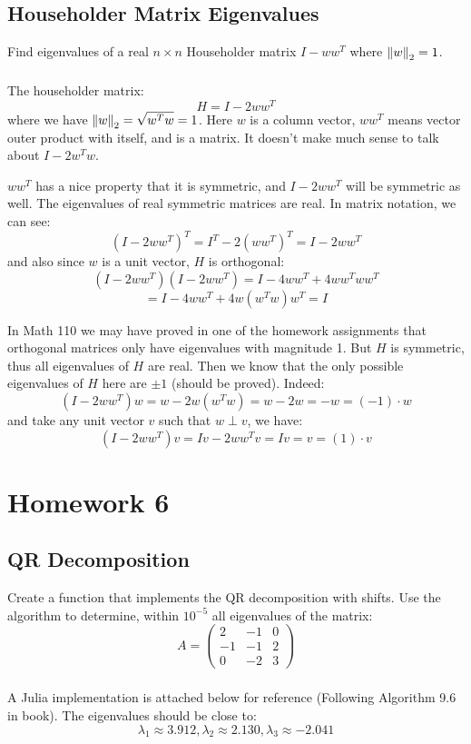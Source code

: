 \documentclass[12pt]{article} %
\newcommand{\1}[1]{\mathds{1}\left[#1\right]}
\begin{document}
\subsection{Householder Matrix Eigenvalues}
Find eigenvalues of a real $n\times n$ Householder matrix $I - ww^T$ where $\norm{w}_2 = 1$.
\subsubsection{}
The householder matrix:
$$
	H = I - 2ww^{T}
$$ where we have $\norm{w}_2 =\sqrt{w^Tw} =1$. Here $w$ is a column vector, $ww^T$ means vector outer product with itself, and is a matrix. It doesn't make much sense to talk about $I - 2w^Tw$.

$ww^T$ has a nice property that it is symmetric, and $I-2ww^T$ will be symmetric as well. The eigenvalues of real symmetric matrices are real. In matrix notation, we can see:
$$
	(I-2ww^T)^T = I^T - 2(ww^T)^T = I - 2ww^T
$$ and also since $w$ is a unit vector, $H$ is orthogonal:
$$
	(I-2ww^T)(I-2ww^T) = I-4ww^T+4ww^Tww^T
$$
$$
	= I-4ww^T+4w(w^Tw)w^T = I
$$

In Math 110 we may have proved in one of the homework assignments that orthogonal matrices only have eigenvalues with magnitude 1. But $H$ is symmetric, thus all eigenvalues of $H$ are real. Then we know that the only possible eigenvalues of $H$ here are $\pm 1$ (should be proved). Indeed:
$$
	(I - 2ww^T)w = w - 2w(w^Tw) = w-2w = -w = (-1)\cdot w
$$ and take any unit vector $v$ such that $w\perp v$, we have:
$$
	(I - 2ww^T)v = Iv - 2ww^Tv = Iv = v = (1)\cdot v
$$

\newpage
\section{Homework 6}
\subsection{QR Decomposition}
Create a function that implements the QR decomposition with shifts. Use the algorithm to determine, within $10^{-5}$ all eigenvalues of the matrix:
$$
	A=
	\begin{pmatrix}
		2 & -1 & 0 \\
		-1 & -1 & 2 \\
		0 & -2 & 3
	\end{pmatrix}
$$
\subsubsection{}
A Julia implementation is attached below for reference (Following Algorithm 9.6 in book). The eigenvalues should be close to:
$$
	\lambda_1 \approx 3.912, \lambda_2 \approx 2.130, \lambda_3 \approx -2.041
$$
\end{document}
